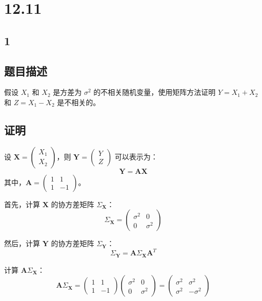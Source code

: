 \documentclass[UTF8]{report}
\theoremstyle{MyLineTheoremStyle} %
\theoremstyle{MyBlockTheoremStyle} %
\theoremstyle{MySubsubsectionStyle} %
\begin{document}
\section{12.11}

\subsection{1}
\subsection*{题目描述}

假设 $X_1$ 和 $X_2$ 是方差为 $\sigma^2$ 的不相关随机变量，使用矩阵方法证明 $Y = X_1 + X_2$ 和 $Z = X_1 - X_2$ 是不相关的。

\subsection*{证明}

设 $\mathbf{X} = \begin{pmatrix} X_1 \\ X_2 \end{pmatrix}$，则 $\mathbf{Y} = \begin{pmatrix} Y \\ Z \end{pmatrix}$ 可以表示为：
\[
\mathbf{Y} = \mathbf{A} \mathbf{X}
\]
其中，$\mathbf{A} = \begin{pmatrix} 1 & 1 \\ 1 & -1 \end{pmatrix}$。

首先，计算 $\mathbf{X}$ 的协方差矩阵 $\Sigma_{\mathbf{X}}$：
\[
\Sigma_{\mathbf{X}} = \begin{pmatrix} \sigma^2 & 0 \\ 0 & \sigma^2 \end{pmatrix}
\]

然后，计算 $\mathbf{Y}$ 的协方差矩阵 $\Sigma_{\mathbf{Y}}$：
\[
\Sigma_{\mathbf{Y}} = \mathbf{A} \Sigma_{\mathbf{X}} \mathbf{A}^T
\]

计算 $\mathbf{A} \Sigma_{\mathbf{X}}$：
\[
\mathbf{A} \Sigma_{\mathbf{X}} = \begin{pmatrix} 1 & 1 \\ 1 & -1 \end{pmatrix} \begin{pmatrix} \sigma^2 & 0 \\ 0 & \sigma^2 \end{pmatrix} = \begin{pmatrix} \sigma^2 & \sigma^2 \\ \sigma^2 & -\sigma^2 \end{pmatrix}
\]
\end{document}
